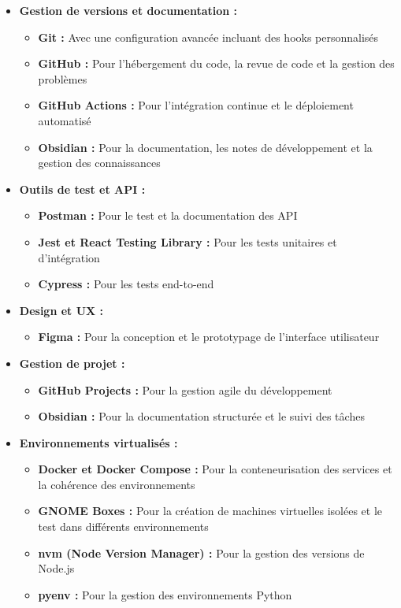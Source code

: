 \begin{itemize}
  \item \textbf{Gestion de versions et documentation :}
  \begin{itemize}
    \item \textbf{Git :} Avec une configuration avancée incluant des hooks personnalisés
    \item \textbf{GitHub :} Pour l'hébergement du code, la revue de code et la gestion des problèmes
    \item \textbf{GitHub Actions :} Pour l'intégration continue et le déploiement automatisé
    \item \textbf{Obsidian :} Pour la documentation, les notes de développement et la gestion des connaissances
  \end{itemize}
  
  \item \textbf{Outils de test et API :}
  \begin{itemize}
    \item \textbf{Postman :} Pour le test et la documentation des API
    \item \textbf{Jest et React Testing Library :} Pour les tests unitaires et d'intégration
    \item \textbf{Cypress :} Pour les tests end-to-end
  \end{itemize}
  
  \item \textbf{Design et UX :}
  \begin{itemize}
    \item \textbf{Figma :} Pour la conception et le prototypage de l'interface utilisateur
  \end{itemize}
  
  \item \textbf{Gestion de projet :}
  \begin{itemize}
    \item \textbf{GitHub Projects :} Pour la gestion agile du développement
    \item \textbf{Obsidian :} Pour la documentation structurée et le suivi des tâches
  \end{itemize}
  
  \item \textbf{Environnements virtualisés :}
  \begin{itemize}
    \item \textbf{Docker et Docker Compose :} Pour la conteneurisation des services et la cohérence des environnements
    \item \textbf{GNOME Boxes :} Pour la création de machines virtuelles isolées et le test dans différents environnements
    \item \textbf{nvm (Node Version Manager) :} Pour la gestion des versions de Node.js
    \item \textbf{pyenv :} Pour la gestion des environnements Python
  \end{itemize}
\end{itemize}

